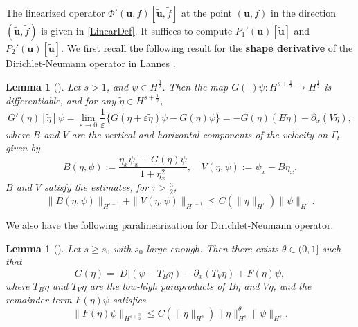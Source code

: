 \documentclass[12pt]{amsart}
\newtheorem{lemma}[theorem]{Lemma}
\theoremstyle{remark}
\theoremstyle{definition}
\numberwithin{equation}{section}
\newcommand{\p}{\partial}
\newcommand{\f}{\frac}
\begin{document}
The linearized operator $\Phi'(\mathbf{u}, f )[\tilde{\mathbf{u}}, \tilde{f}]$ at the point $(\mathbf{u}, f)$ in the direction $(\tilde{\mathbf{u}}, \tilde{f})$ is given in \eqref{LinearDef}.
It suffices to compute $P_1'(\mathbf{u})[\tilde{\mathbf{u}}]$ and $P_2'(\mathbf{u})[\tilde{\mathbf{u}}]$.
We first recall the following result for the \textbf{shape derivative} of the Dirichlet-Neumann operator in Lannes \cite{MR2138139,MR3060183}.
\begin{lemma}[\hspace{1sp}\cite{MR2138139,MR3060183}]
Let $s> 1$, and $\psi \in H^\f32$.
Then the map $G(\cdot)\psi: H^{s+\f12} \rightarrow H^\f12$ is differentiable, and for any $\tilde{\eta}\in H^{s+\f12}$, 
\begin{equation} \label{ShapeDerivative}
G'(\eta)[\tilde{\eta}]\psi = \lim_{\varepsilon\rightarrow 0} \frac{1}{\varepsilon}\{G(\eta+\varepsilon\tilde{\eta})\psi - G(\eta)\psi\} = -G(\eta)(B\tilde{\eta}) - \p_x(V\tilde{\eta}),
\end{equation}
where $B$ and $V$ are the vertical and horizontal components of the velocity on $\Gamma_t$ given by
\begin{equation}\label{BVDef}
B(\eta,\psi) := \dfrac{\eta_x \psi_x + G(\eta)\psi}{1+\eta_x^2}, \quad V(\eta, \psi):=\psi_x - B\eta_x. 
\end{equation}
$B$ and $V$ satisfy the estimates, for $\tau > \f32$, 
\begin{equation*}
 \|B(\eta,\psi)\|_{H^{\tau-1}} + \|V(\eta,\psi)\|_{H^{\tau-1}} \leq C(\| \eta\|_{H^\tau})\|\psi\|_{H^\tau}.
\end{equation*}
\end{lemma}

We also have the following paralinearization for Dirichlet-Neumann operator.
\begin{lemma}[\hspace{1sp}\cite{MR3776276}] \label{t:DNParalinear}
Let $s \geq s_0$ with $s_0$ large enough.
Then there exists $\theta \in (0,1]$ such that 
\begin{equation*}
    G(\eta) = |D|(\psi - T_{B}\eta) - \p_x(T_V \eta) + F(\eta)\psi,
\end{equation*}
where $T_{B}\eta$ and $T_{V}\eta$ are the low-high paraproducts of $B\eta$ and $V\eta$, and the remainder term $F(\eta)\psi$ satisfies
\begin{equation} \label{DNRemainderEst}
\|F(\eta)\psi \|_{H^{s+\f32}} \leq C(\|\eta\|_{H^s}) \|\eta\|^\theta_{H^s} \|\psi\|_{H^s}.
\end{equation}
\end{lemma}
\end{document}
